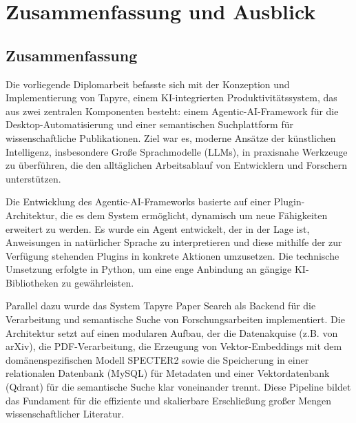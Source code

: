 \chapter{Zusammenfassung und Ausblick}

\section{Zusammenfassung}
Die vorliegende Diplomarbeit befasste sich mit der Konzeption und Implementierung von Tapyre, einem KI-integrierten Produktivitätssystem, das aus zwei zentralen Komponenten besteht: einem Agentic-AI-Framework für die Desktop-Automatisierung und einer semantischen Suchplattform für wissenschaftliche Publikationen. Ziel war es, moderne Ansätze der künstlichen Intelligenz, insbesondere Große Sprachmodelle (LLMs), in praxisnahe Werkzeuge zu überführen, die den alltäglichen Arbeitsablauf von Entwicklern und Forschern unterstützen.

Die Entwicklung des Agentic-AI-Frameworks basierte auf einer Plugin-Architektur, die es dem System ermöglicht, dynamisch um neue Fähigkeiten erweitert zu werden. Es wurde ein Agent entwickelt, der in der Lage ist, Anweisungen in natürlicher Sprache zu interpretieren und diese mithilfe der zur Verfügung stehenden Plugins in konkrete Aktionen umzusetzen. Die technische Umsetzung erfolgte in Python, um eine enge Anbindung an gängige KI-Bibliotheken zu gewährleisten.

Parallel dazu wurde das System Tapyre Paper Search als Backend für die Verarbeitung und semantische Suche von Forschungsarbeiten implementiert. Die Architektur setzt auf einen modularen Aufbau, der die Datenakquise (z.B. von arXiv), die PDF-Verarbeitung, die Erzeugung von Vektor-Embeddings mit dem domänenspezifischen Modell SPECTER2 sowie die Speicherung in einer relationalen Datenbank (MySQL) für Metadaten und einer Vektordatenbank (Qdrant) für die semantische Suche klar voneinander trennt. Diese Pipeline bildet das Fundament für die effiziente und skalierbare Erschließung großer Mengen wissenschaftlicher Literatur.

